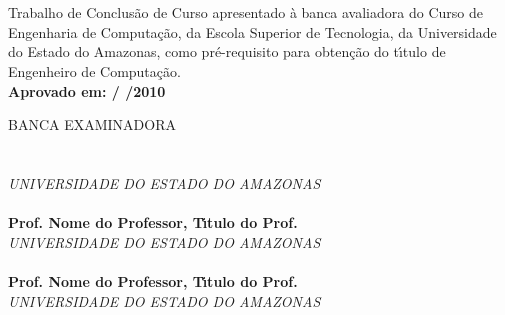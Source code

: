
\begin{center}
\bf \MakeUppercase{\nome}\\[1.5 cm]
\end{center}

\begin{center}
\bf \MakeUppercase{\titulo}\\[1.5cm]
\end{center}

\hspace*{8cm}
\begin{minipage}{8cm}

Trabalho de Conclus\~{a}o de Curso apresentado \`{a}
banca avaliadora do Curso de Engenharia de Computa\c{c}\~{a}o,
da Escola Superior de Tecnologia, da Universidade do Estado do Amazonas,
como pr\'e-requisito para obten\c{c}\~{a}o do t\'{\i}tulo de
Engenheiro de Computa\c{c}\~{a}o.\\

\large \bf Aprovado em:  /  /2010
\end{minipage}

BANCA EXAMINADORA\\[12 pt]

\noindent \hrulefill \hspace*{6cm} \\
\noindent \textbf{\orientador}\\
\textit{UNIVERSIDADE DO ESTADO DO AMAZONAS}\\[0.5cm]

\noindent \hrulefill \hspace*{6cm} \\
\noindent \textbf{Prof. Nome do Professor, T\'{\i}tulo do Prof.}\\
\textit{UNIVERSIDADE DO ESTADO DO AMAZONAS}\\[0.5cm]

\noindent \hrulefill \hspace*{6cm} \\
\noindent \textbf{Prof. Nome do Professor, T\'{\i}tulo do Prof.}\\
\textit{UNIVERSIDADE DO ESTADO DO AMAZONAS}\\
